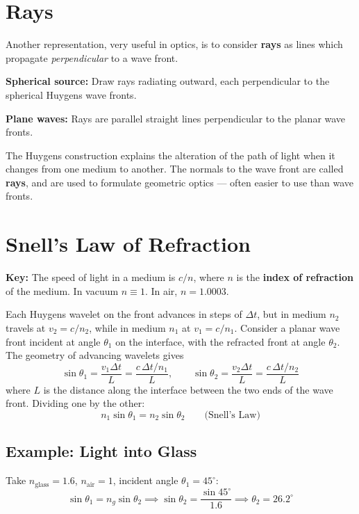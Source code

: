 \documentclass[11pt]{report}
\begin{document}
\section{Rays}

Another representation, very useful in optics, is to consider \textbf{rays} as lines which propagate \emph{perpendicular} to a wave front.

\textbf{Spherical source:} Draw rays radiating outward, each perpendicular to the spherical Huygens wave fronts.

\textbf{Plane waves:} Rays are parallel straight lines perpendicular to the planar wave fronts.

The Huygens construction explains the alteration of the path of light when it changes from one medium to another. The normals to the wave front are called \textbf{rays}, and are used to formulate geometric optics --- often easier to use than wave fronts.

\section{Snell's Law of Refraction}

\textbf{Key:} The speed of light in a medium is $c/n$, where $n$ is the \textbf{index of refraction} of the medium. In vacuum $n \equiv 1$. In air, $n = 1.0003$.

Each Huygens wavelet on the front advances in steps of $\Delta t$, but in medium $n_2$ travels at $v_2 = c/n_2$, while in medium $n_1$ at $v_1 = c/n_1$. Consider a planar wave front incident at angle $\theta_1$ on the interface, with the refracted front at angle $\theta_2$. The geometry of advancing wavelets gives
\begin{equation}
\sin\theta_1 = \frac{v_1 \Delta t}{L} = \frac{c\,\Delta t/n_1}{L}, \qquad \sin\theta_2 = \frac{v_2\Delta t}{L} = \frac{c\,\Delta t/n_2}{L}
\end{equation}
where $L$ is the distance along the interface between the two ends of the wave front. Dividing one by the other:
\begin{equation}
\boxed{n_1 \sin\theta_1 = n_2 \sin\theta_2 \qquad \text{(Snell's Law)}}
\end{equation}

\subsection*{Example: Light into Glass}

Take $n_{\text{glass}} = 1.6$, $n_{\text{air}} = 1$, incident angle $\theta_1 = 45^\circ$:
\begin{equation}
\sin\theta_1 = n_g \sin\theta_2 \implies \sin\theta_2 = \frac{\sin 45^\circ}{1.6} \implies \theta_2 = 26.2^\circ
\end{equation}
\end{document}
